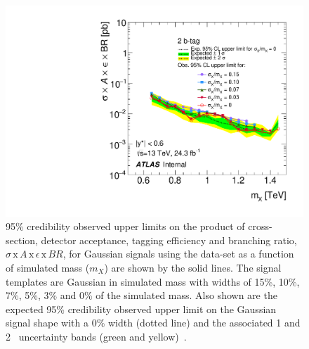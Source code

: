 \begin{figure}[!ht]
  \begin{center}
    \includegraphics[width=0.75\linewidth, angle=0]{figs/Dibjet/lowmass/lim-gaussian.pdf}
  \vspace{-1.5em}
  \end{center}
  \caption[95\% credibility upper limits
    on the product of cross-section, detector acceptance, tagging efficiency and branching ratio,
    $\sigma\,\text{x}\,\mathit{A}\,\text{x}\,\epsilon\,\text{x}\,\mathit{BR}$,
    for Gaussian signals using the \lm{} data-set.]
  {95\% credibility observed upper limits
    on the product of cross-section, detector acceptance, tagging efficiency and branching ratio,
    $\sigma\,\text{x}\,\mathit{A}\,\text{x}\,\epsilon\,\text{x}\,\mathit{BR}$,
    for Gaussian signals using the \lm{} data-set as a function of simulated mass ($m_X$) are shown by the solid lines.
    The signal templates are Gaussian in simulated mass with
    widths of 15\%, 10\%, 7\%, 5\%, 3\% and 0\% of the simulated mass.
    Also shown are the expected 95\% credibility observed upper limit on the Gaussian signal shape with a 0\% width (dotted line)
    and the associated 1 and 2~\sigma{} uncertainty bands (green and yellow)~\cite{dibjet-full_int}.
  }
  \label{fig:lim-lowmass_gauss}
\end{figure}
